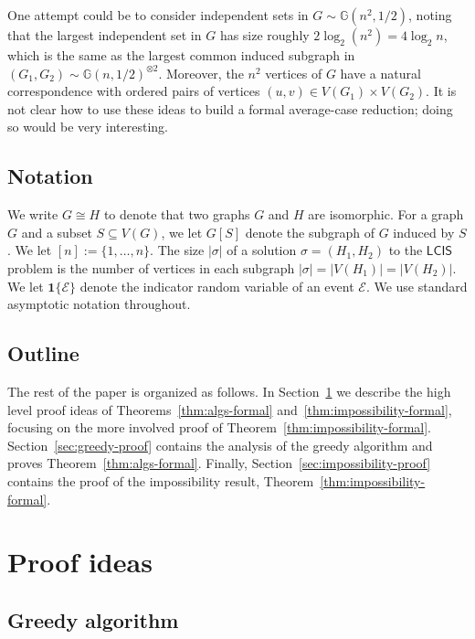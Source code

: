 \documentclass[11pt]{article}
\theoremstyle{plain}
\theoremstyle{definition}
\theoremstyle{remark}
\newcommand{\Gnhalf}{\mathbb{G}(n,1/2)}
\newcommand{\MCS}{\mathsf{LCIS}}
\begin{document}
    One attempt could be to consider independent sets in $G \sim \mathbb{G}(n^{2}, 1/2)$, noting that the largest independent set in $G$ has size roughly $2 \log_{2} (n^{2}) = 4 \log_2 n$, 
    which is the same as the largest common induced subgraph in $(G_{1}, G_{2}) \sim \Gnhalf^{\otimes 2}$. Moreover, the $n^{2}$ vertices of $G$ have a natural correspondence with ordered pairs of vertices $(u,v) \in V(G_{1}) \times V(G_{2})$. 
    It is not clear how to use these ideas to build a formal average-case reduction; doing so would be very interesting. 

    

\subsection{Notation}

We write $G \cong H$ to denote that two graphs $G$ and $H$ are isomorphic. 
For a graph $G$ and a subset $S \subseteq V(G)$, we let $G[S]$ denote the subgraph of $G$ induced by $S$. We let $[n] := \{1, \ldots, n \}$. The size $|\sigma|$ of a solution $\sigma = (H_1, H_2)$ to the $\MCS$ problem is the number of vertices in each subgraph $|\sigma| = |V(H_1)| = |V(H_2)|$. 
We let $\mathbf{1}\{\mathcal{E}\}$ denote the indicator random variable of an event $\mathcal{E}$. 
We use standard asymptotic notation throughout. 

\subsection{Outline}

The rest of the paper is organized as follows. 
In Section~\ref{sec:proof-ideas} we describe the high level proof ideas of Theorems~\ref{thm:algs-formal} and~\ref{thm:impossibility-formal}, focusing on the more involved proof of Theorem~\ref{thm:impossibility-formal}. 
Section~\ref{sec:greedy-proof} contains the analysis of the greedy algorithm and proves Theorem~\ref{thm:algs-formal}. 
Finally, Section~\ref{sec:impossibility-proof} contains the proof of the impossibility result, Theorem~\ref{thm:impossibility-formal}. 

\section{Proof ideas}\label{sec:proof-ideas}

\subsection{Greedy algorithm}\label{sec:greedy-ideas}
\end{document}
